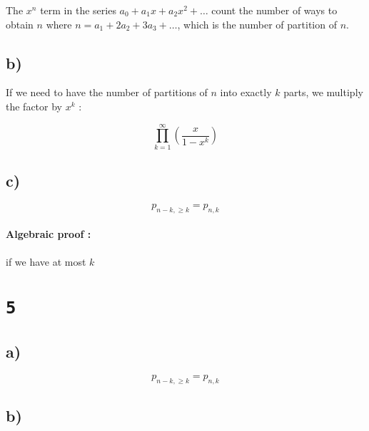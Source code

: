 \documentclass[a4paper,11pt]{report}
\begin{document}
The $x^n$ term in the series $a_0 + a_1x + a_2x^2 + \dots$ count the number of
ways to obtain $n$ where $n = a_1 + 2 a_2 + 3 a_3 + \dots$, which is the number
of partition of $n$.

\subsection*{b)}

If we need to have the number of partitions of $n$ into exactly $k$ parts, we
multiply the factor by $x^k$ :

\[
  \prod_{k=1}^\infty (\frac{x}{1 - x^k})
\]

\subsection*{c)}

\[
  p_{n-k,\geq k} = p_{n,k}
\]

\paragraph{Algebraic proof : } if we have at most $k$

\section*{\texttt{5}}

\subsection*{a)}

\[
  p_{n-k,\geq k} = p_{n,k}
\]

\subsection*{b)}
\end{document}
